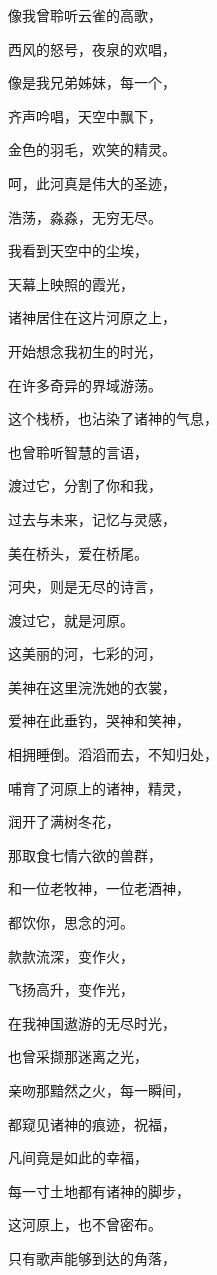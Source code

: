 \documentclass[UTF8]{article}
\begin{document}
\par 像我曾聆听云雀的高歌，
\par 西风的怒号，夜泉的欢唱，
\par 像是我兄弟姊妹，每一个，
\par 齐声吟唱，天空中飘下，
\par 金色的羽毛，欢笑的精灵。
\par 呵，此河真是伟大的圣迹，
\par 浩荡，淼淼，无穷无尽。
\par 我看到天空中的尘埃，
\par 天幕上映照的霞光，
\par 诸神居住在这片河原之上，
\par 开始想念我初生的时光，
\par 在许多奇异的界域游荡。
\par 这个栈桥，也沾染了诸神的气息，
\par 也曾聆听智慧的言语，
\par 渡过它，分割了你和我，
\par 过去与未来，记忆与灵感，
\par 美在桥头，爱在桥尾。
\par 河央，则是无尽的诗言，
\par 渡过它，就是河原。
\par 这美丽的河，七彩的河，
\par 美神在这里浣洗她的衣裳，
\par 爱神在此垂钓，哭神和笑神，
\par 相拥睡倒。滔滔而去，不知归处，
\par 哺育了河原上的诸神，精灵，
\par 润开了满树冬花，
\par 那取食七情六欲的兽群，
\par 和一位老牧神，一位老酒神，
\par 都饮你，思念的河。
\par 款款流深，变作火，
\par 飞扬高升，变作光，
\par 在我神国遨游的无尽时光，
\par 也曾采撷那迷离之光，
\par 亲吻那黯然之火，每一瞬间，
\par 都窥见诸神的痕迹，祝福，
\par 凡间竟是如此的幸福，
\par 每一寸土地都有诸神的脚步，
\par 这河原上，也不曾密布。
\par 只有歌声能够到达的角落，
\end{document}

